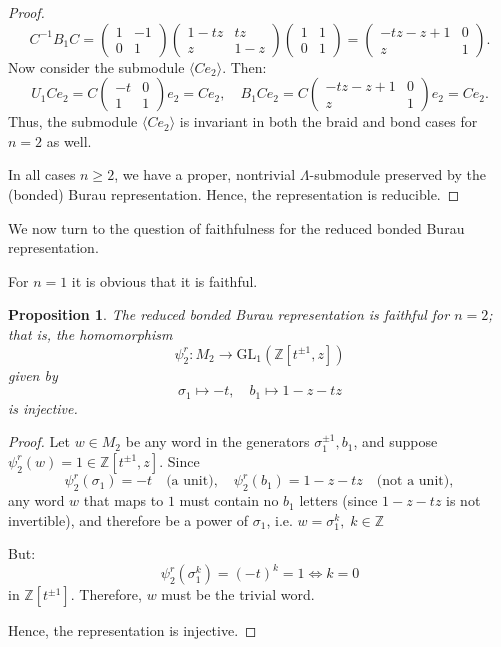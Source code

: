 \documentclass{article}
\theoremstyle{definition}
\theoremstyle{plain}
\newtheorem{proposition}{Proposition}[section]
\theoremstyle{remark}
\begin{document}
\begin{proof}
$$
C^{-1} B_1 C = \begin{pmatrix} 1 & -1 \\ 0 & 1 \end{pmatrix}
\begin{pmatrix} 1 - tz & tz \\ z & 1 - z \end{pmatrix}
\begin{pmatrix} 1 & 1 \\ 0 & 1 \end{pmatrix}
= \begin{pmatrix} -tz - z + 1 & 0 \\ z & 1 \end{pmatrix}.
$$
Now consider the submodule $\langle C e_2 \rangle$. Then:
$$
U_1 C e_2 = C \begin{pmatrix} -t & 0 \\ 1 & 1 \end{pmatrix} e_2 = C e_2,
\quad
B_1 C e_2 = C \begin{pmatrix} -tz - z + 1 & 0 \\ z & 1 \end{pmatrix} e_2 = C e_2.
$$
Thus, the submodule $\langle C e_2 \rangle$ is invariant in both the braid and bond cases for $n = 2$ as well.

\medskip

In all cases $n \geq 2$, we have a proper, nontrivial $\Lambda$-submodule preserved by the (bonded) Burau representation. Hence, the representation is reducible.
\end{proof}



We now turn to the question of faithfulness for the reduced bonded Burau representation.

\medskip

\noindent For $n=1$ it is obvious that it is faithful. 

\begin{proposition}
The reduced bonded Burau representation is faithful for $ n = 2 $; that is, the homomorphism
$$
\psi_2^r : M_2 \longrightarrow \mathrm{GL}_1(\mathbb{Z}[t^{\pm1}, z])
$$
given by
$$
\sigma_1 \mapsto -t, \quad b_1 \mapsto 1 - z - t z
$$
is injective.
\end{proposition}

\begin{proof}
Let $ w \in M_2 $ be any word in the generators $ \sigma_1^{\pm 1}, b_1 $, and suppose $\psi_2^r(w) = 1 \in \mathbb{Z}[t^{\pm1}, z]$.
Since
$$
\psi_2^r(\sigma_1) = -t \quad \text{(a unit)}, \quad
\psi_2^r(b_1) = 1 - z - t z \quad \text{(not a unit)},
$$
any word $ w $ that maps to $ 1 $ must contain no $ b_1 $ letters (since $ 1 - z - t z $ is not invertible), and
therefore be a power of $ \sigma_1 $, i.e. $ w = \sigma_1^k,\; k\in\mathbb{Z} $

But:
$$
\psi_2^r(\sigma_1^k) = (-t)^k = 1 \iff k = 0
$$
in $ \mathbb{Z}[t^{\pm1}] $. Therefore, $ w $ must be the trivial word.

Hence, the representation is injective.
\end{proof}
\end{document}
